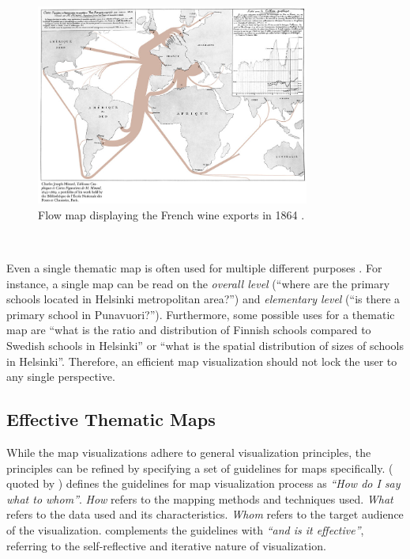 \begin{figure}[htbp]
  \begin{center}
    \includegraphics[width=9cm]{images/flow-example.jpg}
    \caption{Flow map displaying the French wine exports in 1864 \citep{minard_carte_1865}.}
    \label{fig:flow}
  \end{center}
\end{figure}

~

Even a single thematic map is often used for multiple different purposes \citep[chap.~2]{schlichtmann_visualization_2002}. For instance, a single map can be read on the \emph{overall level} (``where are the primary schools located in Helsinki metropolitan area?'') and \emph{elementary level} (``is there a primary school in Punavuori?''). Furthermore, some possible uses for a thematic map are ``what is the ratio and distribution of Finnish schools compared to Swedish schools in Helsinki'' or ``what is the spatial distribution of sizes of schools in Helsinki''. Therefore, an efficient map visualization should not lock the user to any single perspective. 

\subsection{Effective Thematic Maps}
\label{subsection:effectivemaps}

While the map visualizations adhere to general visualization principles, the principles can be refined by specifying a set of guidelines for maps specifically. \citeauthor{koeman_het_1969} (\citeyear{koeman_het_1969} quoted by \citealt[p.~12]{kraak_cartographic_1998}) defines the guidelines for map visualization process as \emph{``How do I say what to whom''}. \emph{How} refers to the mapping methods and techniques used. \emph{What} refers to the data used and its characteristics. \emph{Whom} refers to the target audience of the visualization. \citet{kraak_cartographic_1998} complements the guidelines with \emph{``and is it effective''}, referring to the self-reflective and iterative nature of visualization.

